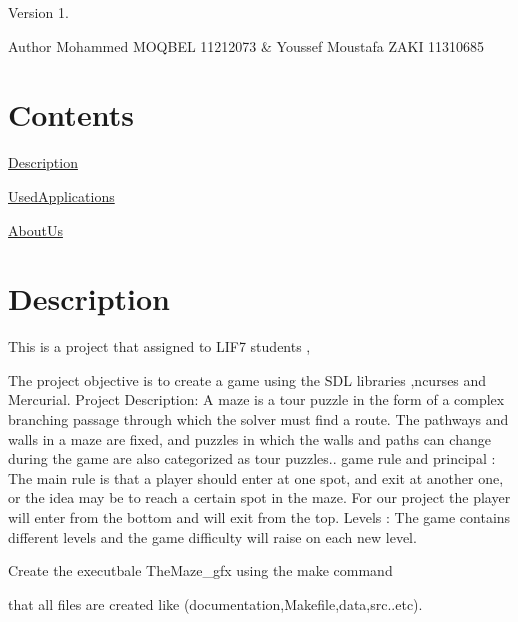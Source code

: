 \begin{DoxyVersion}{Version}
1. 
\end{DoxyVersion}
\begin{DoxyAuthor}{Author}
Mohammed M\-O\-Q\-B\-E\-L 11212073 \& Youssef Moustafa Z\-A\-K\-I 11310685 \par


 
\end{DoxyAuthor}
\hypertarget{index_Contents}{}\section{Contents}\label{index_Contents}
\par

\begin{DoxyEnumerate}
\item \hyperlink{index_Description}{Description}
\item \hyperlink{index_UsedApplications}{Used\-Applications}
\item \hyperlink{index_AboutUs}{About\-Us} \par
 \par
 \par
 

 
\end{DoxyEnumerate}\hypertarget{index_Description}{}\section{Description}\label{index_Description}
This is a project that assigned to L\-I\-F7 students , \par
 The project objective is to create a game using the S\-D\-L libraries ,ncurses and Mercurial. Project Description\-: A maze is a tour puzzle in the form of a complex branching passage through which the solver must find a route. The pathways and walls in a maze are fixed, and puzzles in which the walls and paths can change during the game are also categorized as tour puzzles.. game rule and principal \-: The main rule is that a player should enter at one spot, and exit at another one, or the idea may be to reach a certain spot in the maze. For our project the player will enter from the bottom and will exit from the top. Levels \-: The game contains different levels and the game difficulty will raise on each new level. \par
Create the executbale The\-Maze\-\_\-gfx using the make command \par
 that all files are created like (documentation,Makefile,data,src..etc). \par
\par
 

